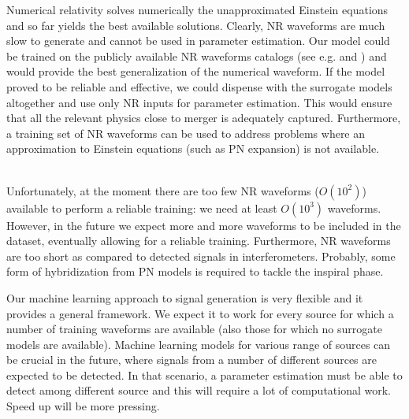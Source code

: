 Numerical relativity solves numerically the unapproximated Einstein equations and so far yields the best available solutions.
Clearly, NR waveforms are much slow to generate and cannot be used in parameter estimation.
Our model could be trained on the publicly available NR waveforms catalogs (see e.g. \cite{Mroue2013NRWFcatalog} and \cite{Healy2017NRWFcatalog}) and would provide the best generalization of the numerical waveform.
If the model proved to be reliable and effective, we could dispense with the surrogate models altogether and use only NR inputs for parameter estimation. This would ensure that all the relevant physics close to merger is adequately captured.
Furthermore, a training set of NR waveforms can be used to address problems where an approximation to Einstein equations (such as PN expansion) is not available.
\par
{}\\
Unfortunately, at the moment there are too few NR waveforms ($O(10^2)$) available to perform a reliable training: we need at least $O(10^3)$ waveforms. However, in the future we expect more and more waveforms to be included in the dataset, eventually allowing for a reliable training.
Furthermore, NR waveforms are too short as compared to detected signals in interferometers. Probably, some form of hybridization from PN models is required to tackle the inspiral phase.
\par
Our machine learning approach to signal generation is very flexible and it provides a general framework. We expect it to work for every source for which a number of training waveforms are available (also those for which no surrogate models are available).
Machine learning models for various range of sources can be crucial in the future, where signals from a number of different sources are expected to be detected. In that scenario, a parameter estimation must be able to detect among different source and this will require a lot of computational work. Speed up will be more pressing.












